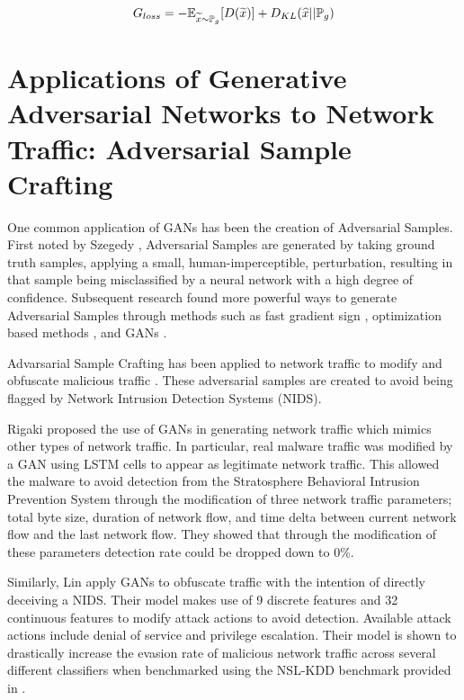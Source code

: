 \begin{equation}
G_{loss} =  -\mathbb{E}_{\widetilde{x} \sim \mathbb{P}_g}[D(\widetilde{x})] + D_{KL}(\widehat{x}||\mathbb{P}_g)
\label{eq:g_loss_new}
\end{equation}



\section{Applications of Generative Adversarial Networks to Network Traffic: Adversarial Sample Crafting}

One common application of GANs has been the creation of Adversarial Samples. First noted by Szegedy \etal \cite{Szegedy2013}, Adversarial Samples are generated by taking ground truth samples, applying a small, human-imperceptible, perturbation, resulting in that sample being misclassified by a neural network with a high degree of confidence. Subsequent research found more powerful ways to generate Adversarial Samples through methods such as fast gradient sign \cite{Goodfellow2015}, optimization based methods \cite{Carlini2017, Liu2017, Eykholt2018}, and GANs \cite{Xiao2018, Rigaki2018, Lin2018, Hu2017, Anderson2017}. 

Advarsarial Sample Crafting has been applied to network traffic to modify and obfuscate malicious traffic \cite{Rigaki2018, Lin2018, Hu2017, Anderson2017}. These adversarial samples are created to avoid being flagged by Network Intrusion Detection Systems (NIDS).

Rigaki \etal \cite{Rigaki2018} proposed the use of GANs in generating network traffic which mimics other types of network traffic. In particular, real malware traffic was modified by a GAN using LSTM cells to appear as legitimate network traffic. This allowed the malware to avoid detection from the Stratosphere Behavioral Intrusion Prevention System through the modification of three network traffic parameters; total byte size, duration of network flow, and time delta between current network flow and the last network flow. They showed that through the modification of these parameters detection rate could be dropped down to 0\%. 

Similarly, Lin \etal \cite{Lin2018} apply GANs to obfuscate traffic with the intention of directly deceiving a NIDS. Their model makes use of 9 discrete features and 32 continuous features to modify attack actions to avoid detection. Available attack actions include denial of service and privilege escalation. Their model is shown to drastically increase the evasion rate of malicious network traffic across several different classifiers when benchmarked using the NSL-KDD benchmark provided in \cite{Hu2015}.

